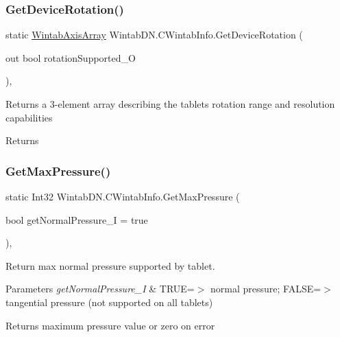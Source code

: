 \subsubsection{\texorpdfstring{Get\+Device\+Rotation()}{GetDeviceRotation()}}
{\footnotesize\ttfamily static \mbox{\hyperlink{struct_wintab_d_n_1_1_wintab_axis_array}{Wintab\+Axis\+Array}} Wintab\+D\+N.\+C\+Wintab\+Info.\+Get\+Device\+Rotation (\begin{DoxyParamCaption}\item[{out bool}]{rotation\+Supported\+\_\+O }\end{DoxyParamCaption})\hspace{0.3cm}{\ttfamily [inline]}, {\ttfamily [static]}}



Returns a 3-\/element array describing the tablet\textquotesingle{}s rotation range and resolution capabilities 

\begin{DoxyReturn}{Returns}

\end{DoxyReturn}
\mbox{\label{class_wintab_d_n_1_1_c_wintab_info_a8e30cbae3a0def0ca807d7b9758484bd}} 
\subsubsection{\texorpdfstring{Get\+Max\+Pressure()}{GetMaxPressure()}}
{\footnotesize\ttfamily static Int32 Wintab\+D\+N.\+C\+Wintab\+Info.\+Get\+Max\+Pressure (\begin{DoxyParamCaption}\item[{bool}]{get\+Normal\+Pressure\+\_\+I = {\ttfamily true} }\end{DoxyParamCaption})\hspace{0.3cm}{\ttfamily [inline]}, {\ttfamily [static]}}



Return max normal pressure supported by tablet. 


\begin{DoxyParams}{Parameters}
{\em get\+Normal\+Pressure\+\_\+I} & T\+R\+UE=$>$ normal pressure; F\+A\+L\+SE=$>$ tangential pressure (not supported on all tablets)\\
\hline
\end{DoxyParams}
\begin{DoxyReturn}{Returns}
maximum pressure value or zero on error
\end{DoxyReturn}
\mbox{\label{class_wintab_d_n_1_1_c_wintab_info_aa99c66ea925e172021f179bb3248e3cd}} 
